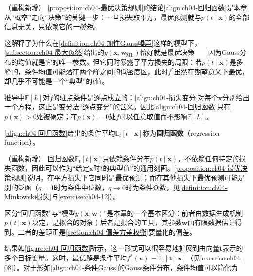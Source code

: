 \documentclass[../../main.tex]{subfiles}
\begin{document}
\begin{remark}（重构新增）
\cref{proposition:ch04-最优决策规则}的结论\eqref{align:ch04-回归函数}是本章从“概率”走向“决策”的关键一步：一旦损失取平方，最优预测就与$p(t\mid\boldsymbol{x})$的全部信息无关，只依赖它的\emph{一阶矩}。

这解释了为什么在\cref{definition:ch04-加性Gauss噪声}这样的模型下，\cref{subsection:ch04-最大似然}给出的$y(\boldsymbol{x},\boldsymbol{w}_{\mathrm{ML}})$恰好就是最优决策——因为Gauss分布的均值就是它的唯一参数。但它同时暴露了平方损失的局限：若$p(t\mid\boldsymbol{x})$是多峰的，条件均值可能落在两个峰之间的低密度区，此时$f^*$虽然在期望意义下最优，却几乎不可能是一个“典型”的$t$值。

推导中$\mathbb{E}[L]$对$f$的驻点条件是逐点成立的：\eqref{align:ch04-损失变分}对每个$\boldsymbol{x}$分别给出一个方程，这正是变分法“逐点变分”的含义。因此\eqref{align:ch04-回归函数}只在$p(\boldsymbol{x})>0$处被确定；在$p(\boldsymbol{x})=0$处$f$可以任意取值而不影响$\mathbb{E}[L]$。
\end{remark}

\begin{definition}[回归函数]\label{definition:ch04-回归函数}
\eqref{align:ch04-回归函数}给出的条件平均$\mathbb{E}_t[t\mid\boldsymbol{x}]$称为\textbf{回归函数}（regression function）。
\end{definition}

\begin{remark}（重构新增）
回归函数$\mathbb{E}_t[t\mid\boldsymbol{x}]$只依赖条件分布$p(t\mid\boldsymbol{x})$，不依赖任何特定的损失函数，因此可以作为“给定$\boldsymbol{x}$时$t$的典型值”的通用刻画。\cref{proposition:ch04-最优决策规则}说明，在平方损失下它同时是最优预测；而在其他损失下最优预测可能是别的泛函（$q=1$时为条件中位数，$q\to0$时为条件众数，见\cref{definition:ch04-Minkowski损失}与\cref{exercise:ch04-12}）。

区分“回归函数”与“模型$y(\boldsymbol{x},\boldsymbol{w})$”是本章的一个基本区分：前者由数据生成机制$p(t\mid\boldsymbol{x})$决定，是拟合的对象；后者是拟合的工具，其参数$\boldsymbol{w}$由有限数据估计得到。二者的差距正是\cref{section:ch04-偏差方差权衡}要量化的偏差。
\end{remark}

结果如\cref{figure:ch04-回归函数}所示，这一形式可以很容易地扩展到由向量$\boldsymbol{t}$表示的多个目标变量。这时，最优解是条件平均$f^*(\boldsymbol{x})=\mathbb{E}_t[\boldsymbol{t}\mid\boldsymbol{x}]$（见\cref{exercise:ch04-08}）。对于形如\eqref{align:ch04-条件Gauss}的Gauss条件分布，条件均值可以简化为
\end{document}
